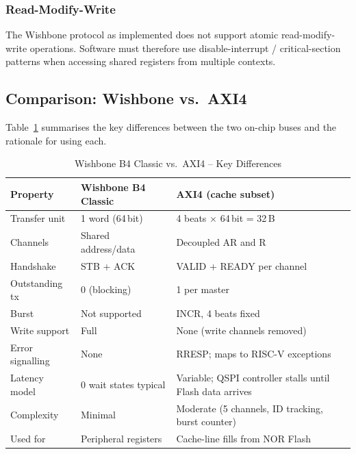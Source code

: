 \subsubsection{Read-Modify-Write}

The Wishbone protocol as implemented does not support atomic
read-modify-write operations.
Software must therefore use disable-interrupt / critical-section
patterns when accessing shared registers from multiple contexts.

\subsection{Comparison: Wishbone vs.\ AXI4}

Table~\ref{tab:asBusCompare} summarises the key differences between the
two on-chip buses and the rationale for using each.

\begin{table}[H]
\caption{Wishbone B4 Classic vs.\ AXI4 -- Key Differences}
\label{tab:asBusCompare}
\centering
\begin{tabularx}{\textwidth}{|l |X |X|}
  \hline
  Property & Wishbone B4 Classic & AXI4 (cache subset) \\
  \hline
  \hline
  Transfer unit     & 1 word (64\,bit)        & 4 beats $\times$ 64\,bit = 32\,B \\
  \hline
  Channels          & Shared address/data     & Decoupled AR and R \\
  \hline
  Handshake         & STB + ACK               & VALID + READY per channel \\
  \hline
  Outstanding tx    & 0 (blocking)            & 1 per master \\
  \hline
  Burst             & Not supported           & INCR, 4 beats fixed \\
  \hline
  Write support     & Full                    & None (write channels removed) \\
  \hline
  Error signalling  & None                    & RRESP; maps to RISC-V exceptions \\
  \hline
  Latency model     & 0 wait states typical   & Variable; QSPI controller stalls until Flash data arrives \\
  \hline
  Complexity        & Minimal                 & Moderate (5 channels, ID tracking, burst counter) \\
  \hline
  Used for          & Peripheral registers    & Cache-line fills from NOR Flash \\
  \hline
\end{tabularx}
\end{table}
